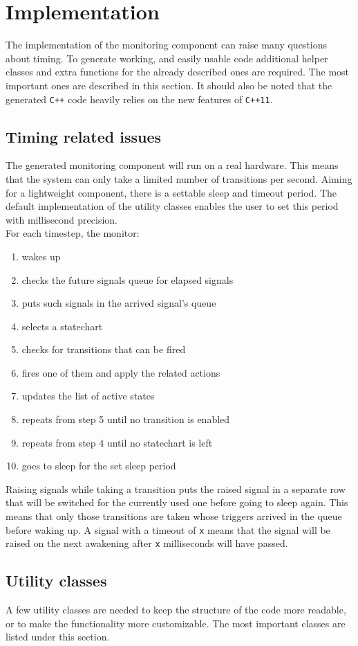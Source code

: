 \section{Implementation}
The implementation of the monitoring component can raise many questions about timing. To generate working, and easily usable code additional helper classes and extra functions for the already described ones are required. The most important ones are described in this section. It should also be noted that the generated \verb!C++! code heavily relies on the new features of \verb!C++11!.
  \subsection{Timing related issues}
The generated monitoring component will run on a real hardware. This means that the system can only take a limited number of transitions per second. Aiming for a lightweight component, there is a settable sleep and timeout period. The default implementation of the utility classes enables the user to set this period with millisecond precision.\\
For each timestep, the monitor:
\begin{enumerate}
  \item wakes up
  \item checks the future signals queue for elapsed signals
  \item puts such signals in the arrived signal's queue
  \item selects a statechart
  \item checks for transitions that can be fired
  \item fires one of them and apply the related actions
  \item updates the list of active states
  \item repeats from step 5 until no transition is enabled
  \item repeats from step 4 until no statechart is left
  \item goes to sleep for the set sleep period
\end{enumerate}
Raising signals while taking a transition puts the raised signal in a separate row that will be switched for the currently used one before going to sleep again. This means that only those transitions are taken whose triggers arrived in the queue before waking up. A signal with a timeout of \verb!x! means that the signal will be raised on the next awakening after \verb!x! milliseconds will have passed.
  \subsection{Utility classes}
A few utility classes are needed to keep the structure of the code more readable, or to make the functionality more customizable. The most important classes are listed under this section.
